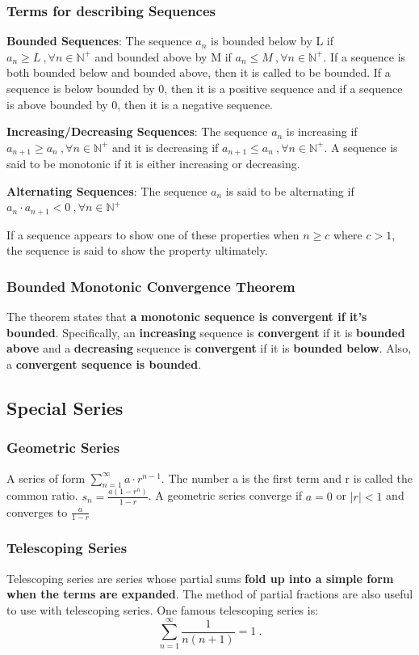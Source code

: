 \documentclass[12pt]{article}
\begin{document}
\subsubsection{Terms for describing Sequences}
\textbf{Bounded Sequences}: The sequence $a_n$ is bounded below by L if $a_n\geq L\ ,\forall n\in \mathbb{N} ^+$ and bounded above by M if $a_n\leq M\ ,\forall n\in \mathbb{N} ^+$. If a sequence is both bounded below and bounded above, then it is called to be bounded. If a sequence is below bounded by 0, then it is a positive sequence and if a sequence is above bounded by 0, then it is a negative sequence. 

\textbf{Increasing/Decreasing Sequences}: The sequence $a_n$ is increasing if \\ $a_{n+1}\geq a_n\ , \forall n\in \mathbb{N} ^+$ and it is decreasing if $a_{n+1}\leq a_n\ , \forall n\in \mathbb{N} ^+$. A sequence is said to be monotonic if it is either increasing or decreasing.

\textbf{Alternating Sequences}: The sequence $a_n$ is said to be alternating if \\ $a_n\cdot a_{n+1}<0\ , \forall n\in \mathbb{N} ^+$

If a sequence appears to show one of these properties when $n\geq c$ where $c>1$, the sequence is said to show the property ultimately.
\subsubsection{Bounded Monotonic Convergence Theorem}
The theorem states that \textbf{a monotonic sequence is convergent if it's bounded}. Specifically, an \textbf{increasing} sequence is \textbf{convergent} if it is \textbf{bounded above} and a \textbf{decreasing} sequence is \textbf{convergent} if it is \textbf{bounded below}. Also, a \textbf{convergent sequence is bounded}.
\subsection{Special Series}
\subsubsection{Geometric Series}
A series of form $\displaystyle{\sum \limits_{n=1}^\infty a\cdot r^{n-1}}$. The number a is the first term and r is called the common ratio. $\displaystyle{s_n=\frac{a(1-r^n)}{1-r}}$. A geometric series converge if $a=0$ or $|r|<1$ and converges to $\displaystyle{\frac{a}{1-r}}$
\subsubsection{Telescoping Series}
Telescoping series are series whose partial sums \textbf{fold up into a simple form when the terms are expanded}. The method of partial fractions are also useful to use with telescoping series. One famous telescoping series is: $$\sum \limits_{n=1}^\infty \frac{1}{n(n+1)} = 1\ .$$
\newpage
\end{document}
